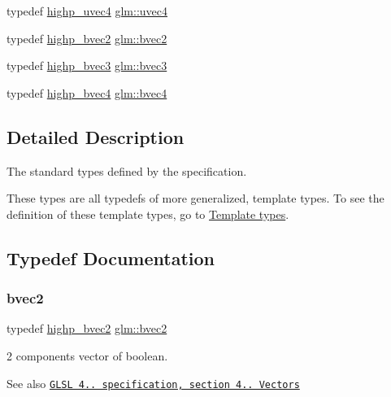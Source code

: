 \begin{DoxyCompactItemize}
\item 
typedef \hyperlink{group__core__precision_gaced82ea2e726f079d4d72cf180a75b8b}{highp\+\_\+uvec4} \hyperlink{group__core__types_ga1c426d19627b32b14f0089f7f4ba7b1d}{glm\+::uvec4}
\item 
typedef \hyperlink{group__core__precision_gaf76ced5823e8aace6bd257fac6c250cb}{highp\+\_\+bvec2} \hyperlink{group__core__types_ga7523cf292181cf7daef3aa0a3267d8e3}{glm\+::bvec2}
\item 
typedef \hyperlink{group__core__precision_gac35c0ff5b9eead09e905b4aa09d1e954}{highp\+\_\+bvec3} \hyperlink{group__core__types_ga3f07d6d37fc6fe875170fd5799685bcf}{glm\+::bvec3}
\item 
typedef \hyperlink{group__core__precision_ga12155cf93fb8fea5d9c4c7e2d72aed4e}{highp\+\_\+bvec4} \hyperlink{group__core__types_ga6bb211b3d3bebae3867548d5673ca5cd}{glm\+::bvec4}
\end{DoxyCompactItemize}


\subsection{Detailed Description}
The standard types defined by the specification. 

These types are all typedefs of more generalized, template types. To see the definition of these template types, go to \hyperlink{group__core__template}{Template types}. 

\subsection{Typedef Documentation}
\mbox{\label{group__core__types_ga7523cf292181cf7daef3aa0a3267d8e3}} 
\subsubsection{\texorpdfstring{bvec2}{bvec2}}
{\footnotesize\ttfamily typedef \hyperlink{group__core__precision_gaf76ced5823e8aace6bd257fac6c250cb}{highp\+\_\+bvec2} \hyperlink{group__core__types_ga7523cf292181cf7daef3aa0a3267d8e3}{glm\+::bvec2}}

2 components vector of boolean.

\begin{DoxySeeAlso}{See also}
\href{http://www.opengl.org/registry/doc/GLSLangSpec.4.20.8.pdf}{\tt G\+L\+SL 4.. specification, section 4.. Vectors} 
\end{DoxySeeAlso}
\mbox{\label{group__core__types_ga3f07d6d37fc6fe875170fd5799685bcf}} 
